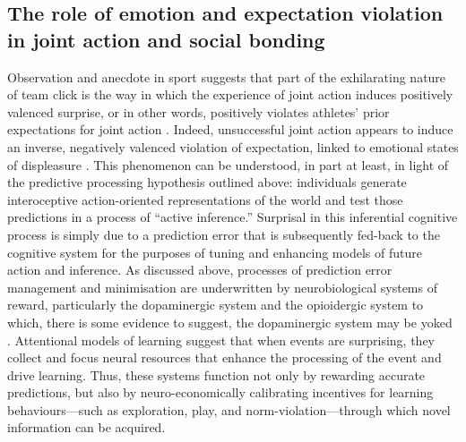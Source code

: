 
\subsection{The role of emotion and expectation violation in joint action and social bonding}
Observation and anecdote in sport suggests that part of the exhilarating nature of team click is the way in which the experience of joint action induces positively valenced surprise, or in other words, positively violates athletes' prior expectations for joint action \citep{Jackson1999}.  Indeed, unsuccessful joint action appears to induce an inverse, negatively valenced violation of expectation, linked to emotional states of displeasure \citep{Ekkekakis2003}.  This phenomenon can be understood, in part at least, in light of the predictive processing hypothesis outlined above: individuals generate interoceptive action-oriented representations of the world and test those predictions in a process of ``active inference.'' Surprisal in this inferential cognitive process is simply due to a prediction error that is subsequently fed-back to the cognitive system for the purposes of tuning and enhancing models of future action and inference\citep{Clark2013}.
As discussed above, processes of prediction error management and minimisation are underwritten by neurobiological systems of reward, particularly the dopaminergic system \citep{Schultz2013} and the opioidergic system to which, there is some evidence to suggest, the dopaminergic system may be yoked \citep{Pecina2013,Laurent2014}. Attentional models of learning suggest that when events are surprising, they collect and focus neural resources that enhance the processing of the event and drive learning. Thus, these systems function not only by rewarding accurate predictions, but also by neuro-economically calibrating incentives for learning behaviours---such as exploration, play, and norm-violation---through which novel information can be acquired\citep{Little2013}.

